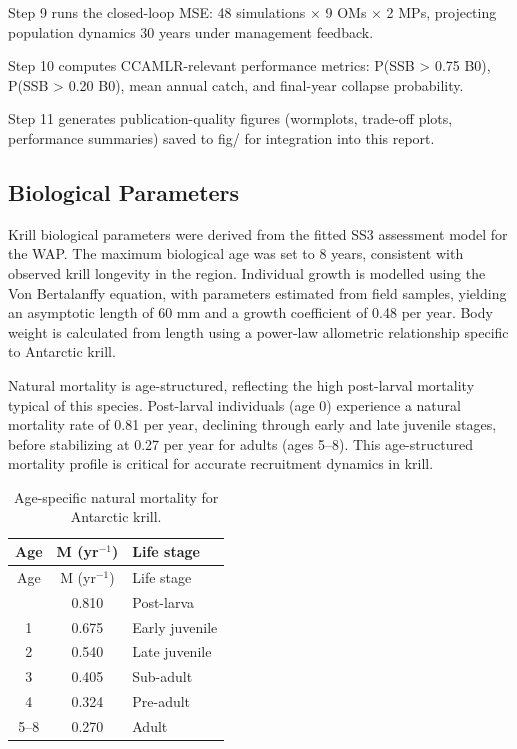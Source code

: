 \documentclass[
]{article}
\begin{document}
Step 9 runs the closed-loop MSE: 48 simulations × 9 OMs × 2 MPs, projecting population dynamics 30 years under management feedback.

Step 10 computes CCAMLR-relevant performance metrics: P(SSB \textgreater{} 0.75 B0), P(SSB \textgreater{} 0.20 B0), mean annual catch, and final-year collapse probability.

Step 11 generates publication-quality figures (wormplots, trade-off plots, performance summaries) saved to fig/ for integration into this report.

\hypertarget{biological-parameters}{%
\subsection{Biological Parameters}\label{biological-parameters}}

Krill biological parameters were derived from the fitted SS3 assessment model for the WAP. The maximum biological age was set to 8 years, consistent with observed krill longevity in the region. Individual growth is modelled using the Von Bertalanffy equation, with parameters estimated from field samples, yielding an asymptotic length of 60 mm and a growth coefficient of 0.48 per year. Body weight is calculated from length using a power-law allometric relationship specific to Antarctic krill.

Natural mortality is age-structured, reflecting the high post-larval mortality typical of this species. Post-larval individuals (age 0) experience a natural mortality rate of 0.81 per year, declining through early and late juvenile stages, before stabilizing at 0.27 per year for adults (ages 5--8). This age-structured mortality profile is critical for accurate recruitment dynamics in krill.

\begin{longtable}[]{@{}ccl@{}}
\caption{Age-specific natural mortality for Antarctic krill.}\tabularnewline
\toprule\noalign{}
Age & M (yr\(^{-1}\)) & Life stage \\
\midrule\noalign{}
\endfirsthead
\toprule\noalign{}
Age & M (yr\(^{-1}\)) & Life stage \\
\midrule\noalign{}
\endhead
\bottomrule\noalign{}
\endlastfoot
0 & 0.810 & Post-larva \\
1 & 0.675 & Early juvenile \\
2 & 0.540 & Late juvenile \\
3 & 0.405 & Sub-adult \\
4 & 0.324 & Pre-adult \\
5--8 & 0.270 & Adult \\
\end{longtable}
\end{document}
